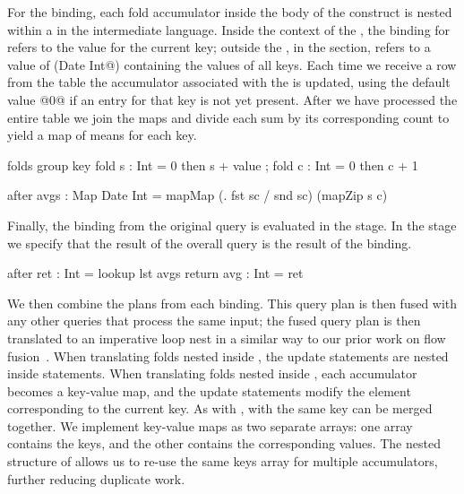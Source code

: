 For the \IcC@avgs@ binding, each fold accumulator inside the body of the \IcC@group@ construct is nested within a \IcC@group@ in the intermediate language.
Inside the context of the \IcC@group@, the binding for \IcC@s@ refers to the \IcC@Int@ value for the current key; outside the \IcC@group@, in the \IcC@after@ section, \IcC@s@ refers to a value of (\IcC@Map Date Int@) containing the values of all keys.
Each time we receive a row from the table the accumulator associated with the \IcC@key@ is updated, using the default value @0@ if an entry for that key is not yet present.
After we have processed the entire table we join the maps and divide each sum by its corresponding count to yield a map of means for each key.
\begin{icicle-core}
folds  { group key
          { fold s : Int = 0 then s + value
          ; fold c : Int = 0 then c + 1 } }

after  { avgs : Map Date Int
          = mapMap (\sc. fst sc / snd sc) (mapZip s c) }
\end{icicle-core}


Finally, the \IcC@ret@ binding from the original query is evaluated in the \IcC@after@ stage. In the \IcC@return@ stage we specify that the result of the overall query \IcC@avg@ is the result of the \IcC@ret@ binding.
\begin{icicle-core}
  after  { ret : Int = lookup lst avgs }
  return { avg : Int = ret }
\end{icicle-core}


We then combine the plans from each binding.
This query plan is then fused with any other queries that process the same input; the fused query plan is then translated to an imperative loop nest in a similar way to our prior work on flow fusion~\cite{lippmeier2013data}.
When translating folds nested inside \IcC@filter@s, the update statements are nested inside \IcC@if@ statements.
When translating folds nested inside \IcC@group@s, each accumulator becomes a key-value map, and the update statements modify the element corresponding to the current key.
As with \IcC@filter@s, \IcC@group@s with the same key can be merged together.
We implement key-value maps as two separate arrays: one array contains the keys, and the other contains the corresponding values.
The nested structure of \IcC@group@s allows us to re-use the same keys array for multiple accumulators, further reducing duplicate work.

